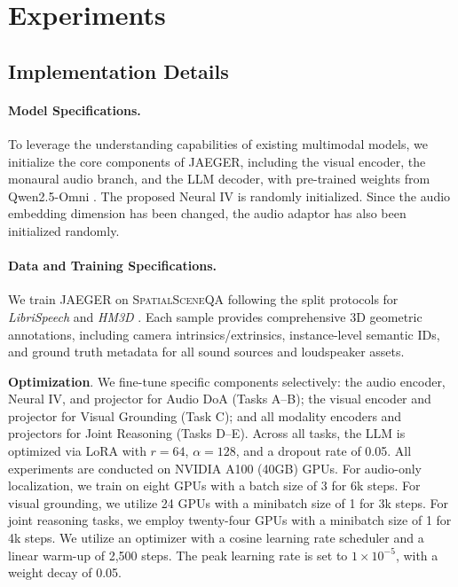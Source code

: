 \section{Experiments}

\subsection{Implementation Details}

\paragraph{Model Specifications.}
To leverage the understanding capabilities of existing multimodal models, we initialize the core components of JAEGER, including the visual encoder, the monaural audio branch, and the LLM decoder, with pre-trained weights from Qwen2.5-Omni \cite{xu2025qwen2}. The proposed Neural IV is randomly initialized. Since the audio embedding dimension has been changed, the audio adaptor has also been initialized randomly.

\paragraph{Data and Training Specifications.}
We train JAEGER on \textsc{SpatialSceneQA} following the split protocols for \textit{LibriSpeech} \cite{panayotov2015librispeech} and \textit{HM3D} \cite{ramakrishnan2021habitat}. Each sample provides comprehensive 3D geometric annotations, including camera intrinsics/extrinsics, instance-level semantic IDs, and ground truth metadata for all sound sources and loudspeaker assets.

\textbf{Optimization}. We fine-tune specific components selectively: the audio encoder, Neural IV, and projector for Audio DoA (Tasks A--B); the visual encoder and projector for Visual Grounding (Task C); and all modality encoders and projectors for Joint Reasoning (Tasks D--E). Across all tasks, the LLM is optimized via LoRA with $r=64$, $\alpha=128$, and a dropout rate of 0.05.
%
All experiments are conducted on NVIDIA A100 (40GB) GPUs. For audio-only localization, we train on eight GPUs with a batch size of 3 for 6k steps. For visual grounding, we utilize 24 GPUs with a minibatch size of 1 for 3k steps. For joint reasoning tasks, we employ twenty-four GPUs with a minibatch size of 1 for 4k steps. We utilize an optimizer with a cosine learning rate scheduler and a linear warm-up of 2,500 steps. The peak learning rate is set to $1 \times 10^{-5}$, with a weight decay of 0.05.

